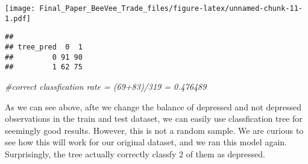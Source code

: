 \documentclass[]{article}
\newenvironment{Shaded}{\begin{snugshade}}{\end{snugshade}}
\newcommand{\KeywordTok}[1]{\textcolor[rgb]{0.13,0.29,0.53}{\textbf{#1}}}
\newcommand{\DataTypeTok}[1]{\textcolor[rgb]{0.13,0.29,0.53}{#1}}
\newcommand{\DecValTok}[1]{\textcolor[rgb]{0.00,0.00,0.81}{#1}}
\newcommand{\StringTok}[1]{\textcolor[rgb]{0.31,0.60,0.02}{#1}}
\newcommand{\CommentTok}[1]{\textcolor[rgb]{0.56,0.35,0.01}{\textit{#1}}}
\newcommand{\OperatorTok}[1]{\textcolor[rgb]{0.81,0.36,0.00}{\textbf{#1}}}
\newcommand{\NormalTok}[1]{#1}
\begin{document}
\texttt{[image: Final\_Paper\_BeeVee\_Trade\_files/figure-latex/unnamed-chunk-11-1.pdf]}

\begin{Shaded}
\end{Shaded}

\begin{verbatim}
##          
## tree_pred  0  1
##         0 91 90
##         1 62 75
\end{verbatim}

\begin{Shaded}
\begin{Highlighting}[]
\CommentTok{#correct classfication rate = (69+83)/319 = 0.476489}
\end{Highlighting}
\end{Shaded}

As we can see above, afte we change the balance of depressed and not
depressed observations in the train and test dataset, we can easily use
classfication tree for seemingly good results. However, this is not a
random sample. We are curious to see how this will work for our original
dataset, and we ran this model again. Surprisingly, the tree actually
correctly classfy 2 of them as depressed.

\begin{Shaded}
\end{Shaded}
\end{document}
